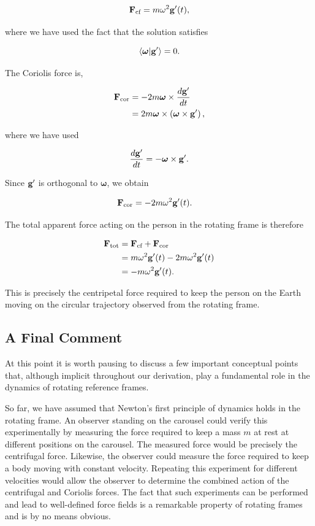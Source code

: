 \documentclass[12pt]{article}
\begin{document}
\[
  \vb F_\text{cf}
  =
  m\omega^2\vb g'(t),
\]

where we have used the fact that the solution satisfies

\[
  \ip{\boldsymbol{\omega}}{\vb g'}=0.
\]

The Coriolis force is,

\[
\begin{aligned}
  \vb F_\text{cor}
  &=
  -2m\boldsymbol{\omega}\times
  \frac{d\vb g'}{dt}
  \\
  &=
  2m\boldsymbol{\omega}\times
  \left(
    \boldsymbol{\omega}\times\vb g'
  \right),
\end{aligned}
\]

where we have used

\[
  \frac{d\vb g'}{dt}
  =
  -\boldsymbol{\omega}\times\vb g'.
\]

Since $\vb g'$ is orthogonal to $\boldsymbol{\omega}$, we obtain

\[
\begin{aligned}
  \vb F_\text{cor}
  &=
  -2m\omega^2\vb g'(t).
\end{aligned}
\]

The total apparent force acting on the person in the rotating frame is therefore

\[
\begin{aligned}
  \vb F_\text{tot}
  &=
  \vb F_\text{cf}
  +
  \vb F_\text{cor}
  \\
  &=
  m\omega^2\vb g'(t)
  -
  2m\omega^2\vb g'(t)
  \\
  &=
  -m\omega^2\vb g'(t).
\end{aligned}
\]

This is precisely the centripetal force required to keep the person on the Earth
moving on the circular trajectory observed from the rotating frame.\par

\subsection{A Final Comment}

At this point it is worth pausing to discuss a few important conceptual points
that, although implicit throughout our derivation, play a fundamental role in
the dynamics of rotating reference frames. \par


So far, we have assumed that Newton's first principle of dynamics holds in the
rotating frame. An observer standing on the carousel could verify this
experimentally by measuring the force required to keep a mass $m$ at rest at
different positions on the carousel. The measured force would be precisely the
centrifugal force. Likewise, the observer could measure the force required to
keep a body moving with constant velocity. Repeating this experiment for
different velocities would allow the observer to determine the combined action
of the centrifugal and Coriolis forces. The fact that such experiments can be
performed and lead to well-defined force fields is a remarkable property of
rotating frames and is by no means obvious. \par
\end{document}
